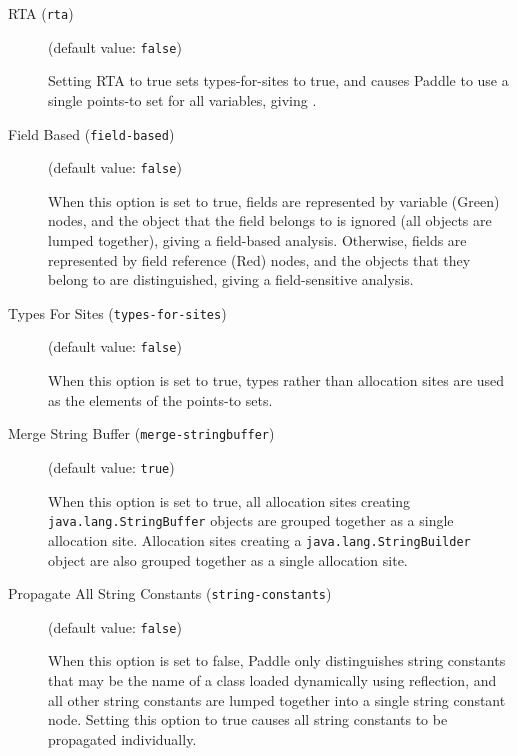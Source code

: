 \documentclass{article}
\begin{document}
\begin{description}

\item[RTA ({\tt rta})]
(default value: {\tt false})




Setting RTA to true sets types-for-sites to true, and causes Paddle to use
a single points-to set for all variables, giving .
        


\item[Field Based ({\tt field-based})]
(default value: {\tt false})




When this option is set to true, fields are represented by variable
(Green) nodes, and the object that the field belongs to is ignored
(all objects are lumped together), giving a field-based analysis. Otherwise, fields are represented by
field reference (Red) nodes, and the objects that they belong to are
distinguished, giving a field-sensitive analysis.
        


\item[Types For Sites ({\tt types-for-sites})]
(default value: {\tt false})




When this option is set to true, types rather than allocation sites are
used as the elements of the points-to sets.
        


\item[Merge String Buffer ({\tt merge-stringbuffer})]
(default value: {\tt true})




When this option is set to true, all allocation sites creating
{\tt java.lang.StringBuffer} objects are grouped together as a single
allocation site. Allocation sites creating a {\tt java.lang.StringBuilder}
object are also grouped together as a single allocation site.
        


\item[Propagate All String Constants ({\tt string-constants})]
(default value: {\tt false})




When this option is set to false, Paddle only distinguishes string constants that
may be the name of a class loaded dynamically using reflection, and all other
string constants are lumped together into a single string constant node.
Setting this option to true causes all string constants to be propagated
individually.
        



\end{description}
\end{document}
